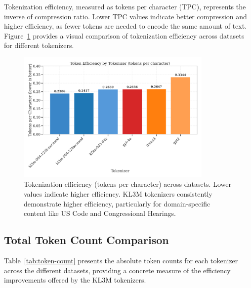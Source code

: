 Tokenization efficiency, measured as tokens per character (TPC), represents the inverse of compression ratio. Lower TPC values indicate better compression and higher efficiency, as fewer tokens are needed to encode the same amount of text. Figure~\ref{fig:token_efficiency_bars} provides a visual comparison of tokenization efficiency across datasets for different tokenizers.

\begin{figure}[htbp]
    \centering
    \includegraphics[width=0.85\textwidth]{figures/token_efficiency_bars.png}
    \caption{Tokenization efficiency (tokens per character) across datasets. Lower values indicate higher efficiency. KL3M tokenizers consistently demonstrate higher efficiency, particularly for domain-specific content like US Code and Congressional Hearings.}
    \label{fig:token_efficiency_bars}
\end{figure}

\subsection{Total Token Count Comparison}
\label{app:token_count}

Table~\ref{tab:token-count} presents the absolute token counts for each tokenizer across the different datasets, providing a concrete measure of the efficiency improvements offered by the KL3M tokenizers.

